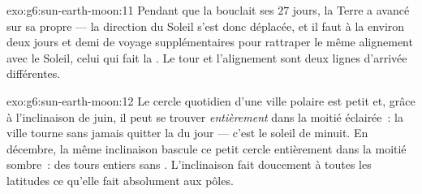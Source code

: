 \begin{solution}{exo:g6:sun-earth-moon:11}
Pendant que la  bouclait ses $27$ jours, la Terre a avancé sur sa
propre  --- la direction du Soleil s'est donc déplacée, et il
faut à la  environ deux jours et demi de voyage supplémentaires
pour rattraper le même alignement avec le Soleil, celui qui fait la
. Le tour et l'alignement sont deux lignes d'arrivée
différentes.
\end{solution}

\begin{solution}{exo:g6:sun-earth-moon:12}
Le cercle quotidien d'une ville polaire est petit et, grâce à
l'inclinaison de juin, il peut se trouver \emph{entièrement} dans la
moitié éclairée~: la ville tourne sans jamais quitter la  du
jour --- c'est le soleil de minuit. En décembre, la même inclinaison
bascule ce petit cercle entièrement dans la moitié sombre~: des tours
entiers sans . L'inclinaison fait doucement à toutes
les latitudes ce qu'elle fait absolument aux pôles.
\end{solution}

